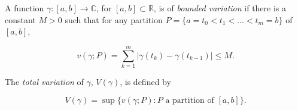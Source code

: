 A function $\gamma: [a, b] \to \mathbb{C}$, for $[a, b] \subset \mathbb{R}$, is of \textit{bounded variation} if there is a constant $M > 0$ such that for any partition $P = \{a = t_0 < t_1 < \ldots < t_m = b\}$ of $[a, b]$,

$$v(\gamma; P) = \sum_{k=1}^{m} |\gamma(t_k) - \gamma(t_{k-1})| \leq M.$$

The \textit{total variation} of $\gamma$, $V(\gamma)$, is defined by

$$V(\gamma) = \sup \{v(\gamma; P): P \text{ a partition of } [a, b]\}.$$
